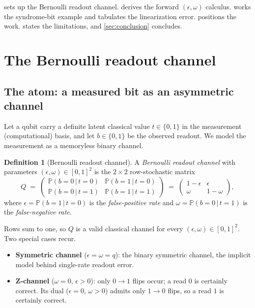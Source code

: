 \documentclass[11pt]{article}
\numberwithin{equation}{section}
\theoremstyle{plain}
\theoremstyle{definition}
\newtheorem{definition}[theorem]{Definition}
\theoremstyle{remark}
\newcommand{\eps}{\epsilon}
\newcommand{\Prob}{\mathbb{P}}
\newcommand{\given}{\,\vert\,}
\newcommand{\bits}{\{0,1\}}
\begin{document}
 sets up the Bernoulli readout channel. 
derives the forward $(\eps,\omega)$ calculus.  works the
syndrome-bit example and tabulates the linearization error. 
positions the work.  states the limitations, and
\cref{sec:conclusion} concludes.


\section{The Bernoulli readout channel}
\label{sec:channel}

\subsection{The atom: a measured bit as an asymmetric channel}

Let a qubit carry a definite latent classical value $t\in\bits$ in the
measurement (computational) basis, and let $b\in\bits$ be the observed readout.
We model the measurement as a memoryless binary channel.

\begin{definition}[Bernoulli readout channel]
\label{def:atom}
A \emph{Bernoulli readout channel} with parameters $(\eps,\omega)\in[0,1]^2$ is
the $2\times2$ row-stochastic matrix
\begin{equation}
\label{eq:channel}
  Q \;=\;
  \begin{pmatrix} \Prob(b=0\given t=0) & \Prob(b=1\given t=0) \\[2pt]
                  \Prob(b=0\given t=1) & \Prob(b=1\given t=1) \end{pmatrix}
  \;=\;
  \begin{pmatrix} 1-\eps & \eps \\[2pt] \omega & 1-\omega \end{pmatrix},
\end{equation}
where $\eps = \Prob(b=1\given t=0)$ is the \emph{false-positive rate} and
$\omega = \Prob(b=0\given t=1)$ is the \emph{false-negative rate}.
\end{definition}

Rows sum to one, so $Q$ is a valid classical channel for every
$(\eps,\omega)\in[0,1]^2$. Two special cases recur.

\begin{itemize}[leftmargin=1.4em]
  \item \textbf{Symmetric channel} ($\eps=\omega=q$): the binary symmetric
        channel, the implicit model behind single-rate readout error.
  \item \textbf{Z-channel} ($\omega=0$, $\eps>0$): only $0\!\to\!1$ flips occur;
        a read $0$ is certainly correct. Its dual ($\eps=0$, $\omega>0$) admits
        only $1\!\to\!0$ flips, so a read $1$ is certainly correct.
\end{itemize}
\end{document}
